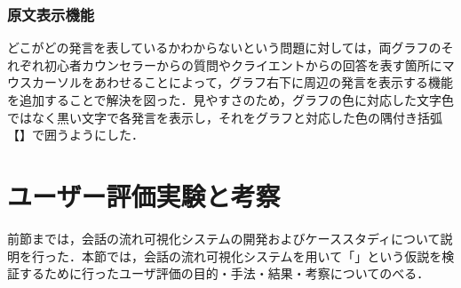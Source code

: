 \documentclass[shuuron]{kuee}
\begin{document}

\subsubsection{原文表示機能}
どこがどの発言を表しているかわからないという問題に対しては，両グラフのそれぞれ初心者カウンセラーからの質問やクライエントからの回答を表す箇所にマウスカーソルをあわせることによって，グラフ右下に周辺の発言を表示する機能を追加することで解決を図った．見やすさのため，グラフの色に対応した文字色ではなく黒い文字で各発言を表示し，それをグラフと対応した色の隅付き括弧【】で囲うようにした．





%
%



\section{ユーザー評価実験と考察}%



前節までは，会話の流れ可視化システムの開発およびケーススタディについて説明を行った．本節では，会話の流れ可視化システムを用いて「」という仮説を検証するために行ったユーザ評価の目的・手法・結果・考察についてのべる．%
%
%
%
%
%
%
\end{document}
